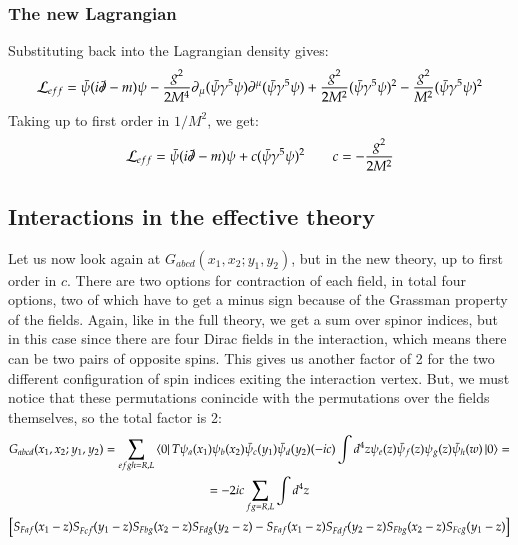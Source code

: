 \documentclass{article}
\begin{document}
\subsubsection{The new Lagrangian}
Substituting back into the Lagrangian density gives:
\begin{equation}
    \mathcal{L}_{eff} = \bar{\psi}(i\slashed{\partial} - m)\psi - \frac{g^2}{2M^4}\partial_\mu(\bar{\psi}\gamma^5\psi) \partial^\mu (\bar{\psi}\gamma^5\psi) + \frac{g^2}{2M^2}(\bar{\psi}\gamma^5\psi)^2 - \frac{g^2}{M^2}(\bar{\psi}\gamma^5\psi)^2
\end{equation}
Taking up to first order in $1/M^2$, we get:
\begin{equation}
    \mathcal{L}_{eff} = \bar{\psi}(i\slashed{\partial} - m)\psi + c(\bar{\psi}\gamma^5\psi)^2
    \qquad
    c = -\frac{g^2}{2M^2}
\end{equation}

\subsection{Interactions in the effective theory}
Let us now look again at $G_{abcd}(x_1, x_2 ; y_1, y_2)$, but in the new theory, up to first order in $c$. There are two options for contraction of each field, in total four options, two of which have to get a minus sign because of the Grassman property of the fields. Again, like in the full theory, we get a sum over spinor indices, but in this case since there are four Dirac fields in the interaction, which means there can be two pairs of opposite spins. This gives us another factor of 2 for the two different configuration of spin indices exiting the interaction vertex. But, we must notice that these permutations conincide with the permutations over the fields themselves, so the total factor is 2:
\begin{equation}
\begin{gathered}
    G_{abcd}(x_1, x_2 ; y_1, y_2) = \sum_{efgh=R,L}
    \bra{0}T\psi_a(x_1)\psi_b(x_2)\bar{\psi}_c(y_1)\bar{\psi}_d(y_2)(-ic)\int d^4z\psi_e(z)\bar{\psi}_f(z)\psi_g(z)\bar{\psi}_h(w)\ket{0} = \\ =
    - 2ic \sum_{fg=R,L}
    \int d^4z \\ \left[S_{Faf}(x_1 - z)S_{Fc\bar{f}}(y_1 - z)S_{Fbg}(x_2 - z)S_{Fd\bar{g}}(y_2 - z) - S_{Faf}(x_1 - z)S_{Fd\bar{f}}(y_2 - z)S_{Fbg}(x_2 - z)S_{Fc\bar{g}}(y_1 - z)\right]
\end{gathered}
\end{equation}
\end{document}
